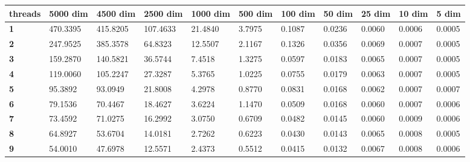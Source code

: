 \begin{table}[ht]
\begin{tabular}{|l|l|l|l|l|l|l|l|l|l|l|}
\hline
\textbf{threads} & \textbf{5000 dim} & \textbf{4500 dim} & \textbf{2500 dim} & \textbf{1000 dim} & \textbf{500 dim} & \textbf{100 dim} & \textbf{50 dim} & \textbf{25 dim} & \textbf{10 dim} & \textbf{5 dim} \\ \hline
\textbf{1}       & 470.3395          & 415.8205          & 107.4633          & 21.4840           & 3.7975           & 0.1087           & 0.0236          & 0.0060          & 0.0006          & 0.0005         \\ \hline
\textbf{2}       & 247.9525          & 385.3578          & 64.8323           & 12.5507           & 2.1167           & 0.1326           & 0.0356          & 0.0069          & 0.0007          & 0.0005         \\ \hline
\textbf{3}       & 159.2870          & 140.5821          & 36.5744           & 7.4518            & 1.3275           & 0.0597           & 0.0183          & 0.0065          & 0.0007          & 0.0005         \\ \hline
\textbf{4}       & 119.0060          & 105.2247          & 27.3287           & 5.3765            & 1.0225           & 0.0755           & 0.0179          & 0.0063          & 0.0007          & 0.0005         \\ \hline
\textbf{5}       & 95.3892           & 93.0949           & 21.8008           & 4.2978            & 0.8770           & 0.0831           & 0.0168          & 0.0062          & 0.0007          & 0.0007         \\ \hline
\textbf{6}       & 79.1536           & 70.4467           & 18.4627           & 3.6224            & 1.1470           & 0.0509           & 0.0168          & 0.0060          & 0.0007          & 0.0006         \\ \hline
\textbf{7}       & 73.4592           & 71.0275           & 16.2992           & 3.0750            & 0.6709           & 0.0482           & 0.0145          & 0.0060          & 0.0009          & 0.0006         \\ \hline
\textbf{8}       & 64.8927           & 53.6704           & 14.0181           & 2.7262            & 0.6223           & 0.0430           & 0.0143          & 0.0065          & 0.0008          & 0.0005         \\ \hline
\textbf{9}       & 54.0010           & 47.6978           & 12.5571           & 2.4373            & 0.5512           & 0.0415           & 0.0132          & 0.0067          & 0.0008          & 0.0006         \\ \hline

\end{tabular}
\end{table}
